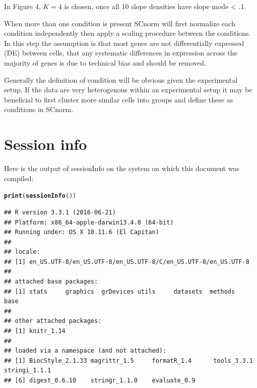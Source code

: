 \documentclass{article}\usepackage[]{graphicx}\usepackage[usenames,dvipsnames]{color}
\makeatletter
\newcommand{\hlstd}[1]{\textcolor[rgb]{0.345,0.345,0.345}{#1}}%
\newcommand{\hlkwd}[1]{\textcolor[rgb]{0.737,0.353,0.396}{\textbf{#1}}}%
\newenvironment{kframe}{%
 \def\at@end@of@kframe{}%
 \ifinner\ifhmode%
  \def\at@end@of@kframe{\end{minipage}}%
  \begin{minipage}{\columnwidth}%
 \fi\fi%
 \def\FrameCommand##1{\hskip\@totalleftmargin \hskip-\fboxsep
 \colorbox{shadecolor}{##1}\hskip-\fboxsep
     \hskip-\linewidth \hskip-\@totalleftmargin \hskip\columnwidth}%
 \MakeFramed {\advance\hsize-\width
   \@totalleftmargin\z@ \linewidth\hsize
   \@setminipage}}%
 {\par\unskip\endMakeFramed%
 \at@end@of@kframe}
\newenvironment{knitrout}{}{} %
\makeatother
\begin{document}
In Figure 4, $K = 4$ is chosen, once all 10 slope densities have slope mode < .1.

\newpage

When more than one condition is present SCnorm will first normalize each condition independently then apply a scaling procedure between the conditions. In this step the assumption is that most genes are not differentially expressed (DE) between cells, that any systematic differences in expression across the majority of genes is due to technical bias and should be removed.

Generally the definition of condition will be obvious given the experimental setup. If the data are very heterogenous within an experimental setup it may be beneficial to first cluster more similar cells into groups and define these as conditions in SCnorm.

\section{Session info}
Here is the output of sessionInfo on the system on which this document was compiled:
\begin{knitrout}
\color{fgcolor}\begin{kframe}
\begin{alltt}
  \hlkwd{print}\hlstd{(}\hlkwd{sessionInfo}\hlstd{())}
\end{alltt}
\begin{verbatim}
## R version 3.3.1 (2016-06-21)
## Platform: x86_64-apple-darwin13.4.0 (64-bit)
## Running under: OS X 10.11.6 (El Capitan)
## 
## locale:
## [1] en_US.UTF-8/en_US.UTF-8/en_US.UTF-8/C/en_US.UTF-8/en_US.UTF-8
## 
## attached base packages:
## [1] stats     graphics  grDevices utils     datasets  methods   base     
## 
## other attached packages:
## [1] knitr_1.14
## 
## loaded via a namespace (and not attached):
## [1] BiocStyle_2.1.33 magrittr_1.5     formatR_1.4      tools_3.3.1      stringi_1.1.1   
## [6] digest_0.6.10    stringr_1.1.0    evaluate_0.9
\end{verbatim}
\end{kframe}
\end{knitrout}
  
  \vspace{1cm}
%


%
\end{document}
